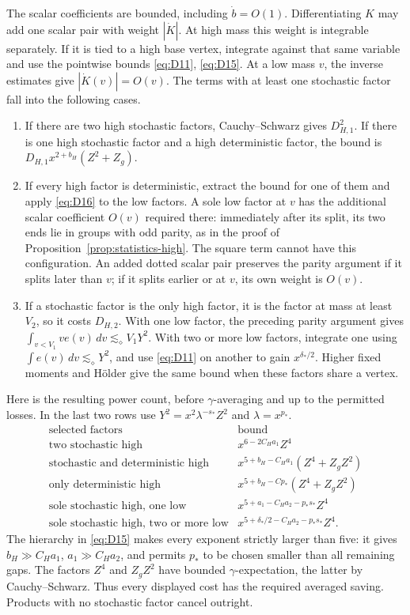 The scalar coefficients are bounded, including \(\dot b=O(1)\).
Differentiating \(K\) may add one scalar pair with weight
\(|\dot K|\). At high mass this weight is integrable separately. If
it is tied to a high base vertex, integrate against that same variable
and use the pointwise bounds \eqref{eq:D11}, \eqref{eq:D15}. At a low
mass \(v\), the inverse estimates give \(|\dot K(v)|=O(v)\).
The terms with at least one stochastic factor fall into the following
cases.
\begin{enumerate}
\item If there are two high stochastic factors, Cauchy--Schwarz gives
\(D_{H,1}^2\). If there is one high stochastic factor and a high
deterministic factor, the bound is
\(D_{H,1}x^{2+b_H}(Z^2+Z_g)\).
\item If every high factor is deterministic, extract the bound for
one of them and apply \eqref{eq:D16} to the low factors. A sole low
factor at \(v\) has the additional scalar coefficient \(O(v)\)
required there: immediately after its split, its two ends lie in
groups with odd parity, as in the proof of
Proposition~\ref{prop:statistics-high}. The square term cannot have
this configuration. An added dotted scalar pair preserves the
parity argument if it splits later than \(v\); if it splits earlier
or at \(v\), its own weight is \(O(v)\).
\item If a stochastic factor is the only high factor, it is the
factor at mass at least \(V_2\), so it costs \(D_{H,2}\). With one low
factor, the preceding parity argument gives
\(\int_{v<V_1}v e(v)\,dv\lesssim_\diamond V_1Y^2\). With two or more
low factors, integrate one using
\(\int e(v)\,dv\lesssim_\diamond Y^2\), and use \eqref{eq:D11} on
another to gain \(x^{\delta_*/2}\). Higher fixed moments and H\"older
give the same bound when these factors share a vertex.
\end{enumerate}
Here is the resulting power count, before \(\gamma\)-averaging and up
to the permitted losses. In the last two rows use
\(Y^2=x^2\lambda^{-s_*}Z^2\) and \(\lambda=x^{p_*}\).
\[
\begin{array}{l|l}
\text{selected factors}&\text{bound}\\ \hline
\text{two stochastic high}&x^{6-2C_Ha_1}Z^4\\
\text{stochastic and deterministic high}
 &x^{5+b_H-C_Ha_1}(Z^4+Z_gZ^2)\\
\text{only deterministic high}
 &x^{5+b_H-Cp_*}(Z^4+Z_gZ^2)\\
\text{sole stochastic high, one low}
 &x^{5+a_1-C_Ha_2-p_*s_*}Z^4\\
\text{sole stochastic high, two or more low}
 &x^{5+\delta_*/2-C_Ha_2-p_*s_*}Z^4.
\end{array}
\]
The hierarchy in \eqref{eq:D15} makes every exponent strictly larger
than five: it gives \(b_H\gg C_Ha_1\), \(a_1\gg C_Ha_2\), and permits
\(p_*\) to be chosen smaller than all remaining gaps. The factors
\(Z^4\) and \(Z_gZ^2\) have bounded \(\gamma\)-expectation, the latter
by Cauchy--Schwarz. Thus every displayed cost has the required
averaged saving. Products with no stochastic factor cancel outright.

